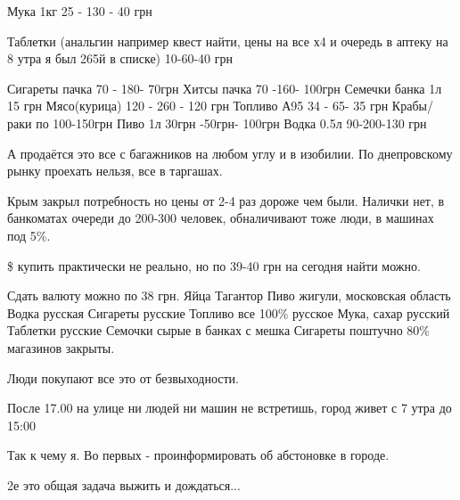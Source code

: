 Мука 1кг 25 - 130 - 40 грн

Таблетки (анальгин например квест найти, цены на все х4 и очередь в аптеку на 8
утра я был 265й в списке) 10-60-40 грн

\obeycr
Сигареты пачка 70 - 180- 70грн
Хитсы пачка 70 -160- 100грн
Семечки банка 1л 15 грн
Мясо(курица) 120 - 260 - 120 грн
Топливо А95 34 - 65- 35 грн
Крабы/раки  по 100-150грн
Пиво 1л 30грн -50грн- 100грн
Водка 0.5л 90-200-130 грн
\restorecr

А продаётся это все с багажников на любом углу и в изобилии. По днепровскому
рынку проехать нельзя, все в таргашах.

Крым закрыл потребность но цены от 2-4 раз дороже чем были. Налички нет, в
банкоматах очереди до 200-300 человек, обналичивают тоже люди, в машинах под
5\%. 

\$ купить практически не реально, но по 39-40 грн  на сегодня найти можно.

\obeycr
Сдать валюту можно по 38 грн.
Яйца Тагантор
Пиво жигули, московская область
Водка русская
Сигареты русские
Топливо все 100\% русское
Мука, сахар русский
Таблетки русские
Семочки сырые в банках с мешка
Сигареты поштучно
80\% магазинов закрыты.
\restorecr

Люди покупают все это от безвыходности.

После 17.00 на улице ни людей ни машин не встретишь, город живет с 7 утра до
15:00

Так к чему я.  Во первых - проинформировать об абстоновке в городе. 

2е это общая задача выжить и дождаться...

